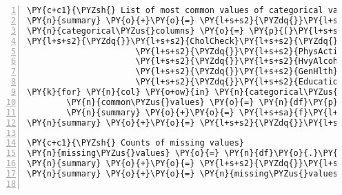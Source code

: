 \documentclass[11pt]{article}
\begin{document}
\begin{Verbatim}[commandchars=\\\{\},numbers=left,firstnumber=1,stepnumber=1,formatcom=\footnotesize]
\PY{c+c1}{\PYZsh{} List of most common values of categorical variables}
\PY{n}{summary} \PY{o}{+}\PY{o}{=} \PY{l+s+s2}{\PYZdq{}}\PY{l+s+s2}{Most Common Values:}\PY{l+s+se}{\PYZbs{}n}\PY{l+s+s2}{\PYZdq{}}
\PY{n}{categorical\PYZus{}columns} \PY{o}{=} \PY{p}{[}\PY{l+s+s2}{\PYZdq{}}\PY{l+s+s2}{Diabetes\PYZus{}binary}\PY{l+s+s2}{\PYZdq{}}\PY{p}{,} \PY{l+s+s2}{\PYZdq{}}\PY{l+s+s2}{HighBP}\PY{l+s+s2}{\PYZdq{}}\PY{p}{,} \PY{l+s+s2}{\PYZdq{}}\PY{l+s+s2}{HighChol}\PY{l+s+s2}{\PYZdq{}}\PY{p}{,} \PYZbs{}
\PY{l+s+s2}{\PYZdq{}}\PY{l+s+s2}{CholCheck}\PY{l+s+s2}{\PYZdq{}}\PY{p}{,} \PY{l+s+s2}{\PYZdq{}}\PY{l+s+s2}{Smoker}\PY{l+s+s2}{\PYZdq{}}\PY{p}{,} \PY{l+s+s2}{\PYZdq{}}\PY{l+s+s2}{Stroke}\PY{l+s+s2}{\PYZdq{}}\PY{p}{,} \PY{l+s+s2}{\PYZdq{}}\PY{l+s+s2}{HeartDiseaseorAttack}\PY{l+s+s2}{\PYZdq{}}\PY{p}{,}
                      \PY{l+s+s2}{\PYZdq{}}\PY{l+s+s2}{PhysActivity}\PY{l+s+s2}{\PYZdq{}}\PY{p}{,} \PY{l+s+s2}{\PYZdq{}}\PY{l+s+s2}{Fruits}\PY{l+s+s2}{\PYZdq{}}\PY{p}{,} \PY{l+s+s2}{\PYZdq{}}\PY{l+s+s2}{Veggies}\PY{l+s+s2}{\PYZdq{}}\PY{p}{,} \PYZbs{}
                      \PY{l+s+s2}{\PYZdq{}}\PY{l+s+s2}{HvyAlcoholConsump}\PY{l+s+s2}{\PYZdq{}}\PY{p}{,} \PY{l+s+s2}{\PYZdq{}}\PY{l+s+s2}{AnyHealthcare}\PY{l+s+s2}{\PYZdq{}}\PY{p}{,} \PY{l+s+s2}{\PYZdq{}}\PY{l+s+s2}{NoDocbcCost}\PY{l+s+s2}{\PYZdq{}}\PY{p}{,}
                      \PY{l+s+s2}{\PYZdq{}}\PY{l+s+s2}{GenHlth}\PY{l+s+s2}{\PYZdq{}}\PY{p}{,} \PY{l+s+s2}{\PYZdq{}}\PY{l+s+s2}{DiffWalk}\PY{l+s+s2}{\PYZdq{}}\PY{p}{,} \PY{l+s+s2}{\PYZdq{}}\PY{l+s+s2}{Sex}\PY{l+s+s2}{\PYZdq{}}\PY{p}{,} \PY{l+s+s2}{\PYZdq{}}\PY{l+s+s2}{Age}\PY{l+s+s2}{\PYZdq{}}\PY{p}{,} \PYZbs{}
                      \PY{l+s+s2}{\PYZdq{}}\PY{l+s+s2}{Education}\PY{l+s+s2}{\PYZdq{}}\PY{p}{,} \PY{l+s+s2}{\PYZdq{}}\PY{l+s+s2}{Income}\PY{l+s+s2}{\PYZdq{}}\PY{p}{]}
\PY{k}{for} \PY{n}{col} \PY{o+ow}{in} \PY{n}{categorical\PYZus{}columns}\PY{p}{:}
        \PY{n}{common\PYZus{}values} \PY{o}{=} \PY{n}{df}\PY{p}{[}\PY{n}{col}\PY{p}{]}\PY{o}{.}\PY{n}{value\PYZus{}counts}\PY{p}{(}\PY{p}{)}\PY{o}{.}\PY{n}{head}\PY{p}{(}\PY{l+m+mi}{5}\PY{p}{)}
        \PY{n}{summary} \PY{o}{+}\PY{o}{=} \PY{l+s+sa}{f}\PY{l+s+s2}{\PYZdq{}}\PY{l+s+si}{\PYZob{}}\PY{n}{col}\PY{l+s+si}{\PYZcb{}}\PY{l+s+s2}{: }\PY{l+s+si}{\PYZob{}}\PY{n}{common\PYZus{}values}\PY{l+s+si}{\PYZcb{}}\PY{l+s+se}{\PYZbs{}n}\PY{l+s+s2}{\PYZdq{}}
\PY{n}{summary} \PY{o}{+}\PY{o}{=} \PY{l+s+s2}{\PYZdq{}}\PY{l+s+se}{\PYZbs{}n}\PY{l+s+s2}{\PYZdq{}}

\PY{c+c1}{\PYZsh{} Counts of missing values}
\PY{n}{missing\PYZus{}values} \PY{o}{=} \PY{n}{df}\PY{o}{.}\PY{n}{isnull}\PY{p}{(}\PY{p}{)}\PY{o}{.}\PY{n}{sum}\PY{p}{(}\PY{p}{)}
\PY{n}{summary} \PY{o}{+}\PY{o}{=} \PY{l+s+s2}{\PYZdq{}}\PY{l+s+s2}{Counts of Missing Values:}\PY{l+s+se}{\PYZbs{}n}\PY{l+s+s2}{\PYZdq{}}
\PY{n}{summary} \PY{o}{+}\PY{o}{=} \PY{n}{missing\PYZus{}values}\PY{o}{.}\PY{n}{to\PYZus{}string}\PY{p}{(}\PY{p}{)} \PY{o}{+} \PY{l+s+s2}{\PYZdq{}}\PY{l+s+se}{\PYZbs{}n}\PY{l+s+s2}{\PYZdq{}}


\end{Verbatim}
\end{document}
